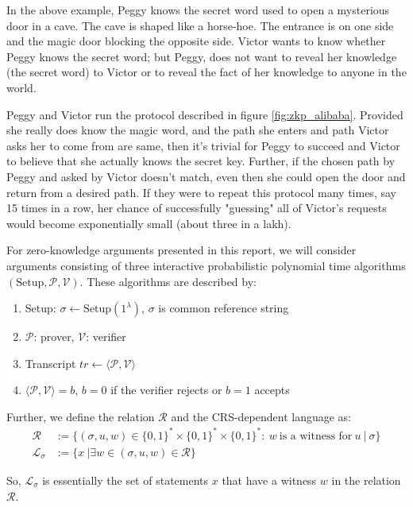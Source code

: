 In the above example, Peggy knows the secret word used to open a mysterious door in a cave. The cave is shaped like a horse-hoe. The entrance is on one side and the magic door blocking the opposite side. Victor wants to know whether Peggy knows the secret word; but Peggy, does not want to reveal her knowledge (the secret word) to Victor or to reveal the fact of her knowledge to anyone in the world. 

Peggy and Victor run the protocol described in figure \ref{fig:zkp_alibaba}. Provided she really does know the magic word, and the path she enters and path Victor asks her to come from are same, then it's trivial for Peggy to succeed and Victor to believe that she actually knows the secret key. Further, if the chosen path by Peggy and asked by Victor doesn't match, even then she could open the door and return from a desired path. If they were to repeat this protocol many times, say 15 times in a row, her chance of successfully "guessing" all of Victor's requests would become exponentially small (about three in a lakh).

For zero-knowledge arguments presented in this report, we will consider arguments consisting of three interactive probabilistic polynomial time algorithms $(\text{Setup}, \mathcal{P}, \mathcal{V})$. These algorithms are described by:
\begin{enumerate}
    \item Setup: $\sigma \leftarrow \text{Setup}(1^{\lambda})$, $\sigma$ is common reference string
    \item $\mathcal{P}$: prover, $\mathcal{V}$: verifier
    \item Transcript $tr \leftarrow \langle \mathcal{P}, \mathcal{V} \rangle$
    \item $\langle \mathcal{P}, \mathcal{V} \rangle = b$, $b=0$ if the verifier rejects or $b=1$ accepts 
\end{enumerate}

Further, we define the relation $\mathcal{R}$ and the CRS-dependent language as:
\begin{align*}
    \mathcal{R} &:= \{ (\sigma, u, w) \in \{0,1\}^{\ast} \times  \{0,1\}^{\ast} \times  \{0,1\}^{\ast}: \ w \ \text{is a witness for}\ u \ | \ \sigma \}\\
    \mathcal{L}_{\sigma} &:=  \{ x \ | \exists w \in (\sigma, u, w) \in \mathcal{R} \}
\end{align*}

So, $\mathcal{L}_{\sigma}$ is essentially the set of statements $x$ that have a witness $w$ in the relation $\mathcal{R}$. 

